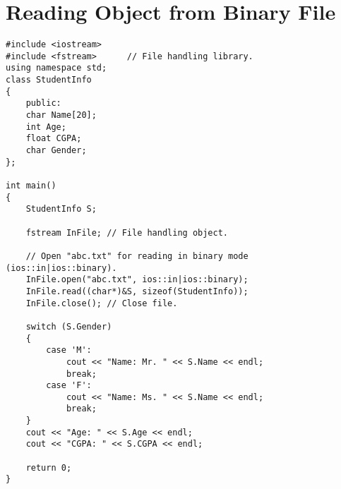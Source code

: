 \documentclass[12pt,a4paper]{article}
\begin{document}
\section{Reading Object from Binary File}
\begin{lstlisting}[caption={Reading an object from binary file}]
#include <iostream>
#include <fstream>		// File handling library.
using namespace std;
class StudentInfo
{
	public:
	char Name[20];
	int Age;
	float CGPA;
	char Gender;
};

int main()
{
	StudentInfo S;

	fstream InFile;	// File handling object.

	// Open "abc.txt" for reading in binary mode (ios::in|ios::binary).
	InFile.open("abc.txt", ios::in|ios::binary);
	InFile.read((char*)&S, sizeof(StudentInfo));
	InFile.close();	// Close file.

	switch (S.Gender)
	{
		case 'M':
			cout << "Name: Mr. " << S.Name << endl;
			break;
		case 'F':
			cout << "Name: Ms. " << S.Name << endl;
			break;
	}
	cout << "Age: " << S.Age << endl;
	cout << "CGPA: " << S.CGPA << endl;

	return 0;
}
\end{lstlisting}


\end{document}
